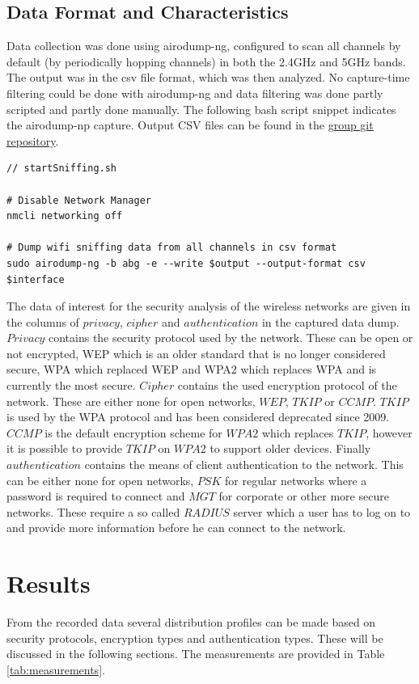 \documentclass[letterpaper, 10 pt, conference]{ieeeconf}  %
\begin{document}
\subsection{Data Format and Characteristics}
Data collection was done using airodump-ng, configured to scan all channels by default (by periodically hopping channels) in both the 2.4GHz and 5GHz bands. The output was in the csv file format, which was then analyzed. No capture-time filtering could be done with airodump-ng and data filtering was done partly scripted and partly done manually. The following bash script snippet indicates the airodump-np capture. Output CSV files can be found in the \href{https://github.com/HOkkerman/ET4394/tree/master/wireshark_airodump_captures/airodump}{group git repository}.
\begin{lstlisting}
// startSniffing.sh

# Disable Network Manager
nmcli networking off

# Dump wifi sniffing data from all channels in csv format
sudo airodump-ng -b abg -e --write $output --output-format csv $interface

\end{lstlisting}
 
The data of interest for the security analysis of the wireless networks are given in the columns of $privacy$, $cipher$ and $authentication$ in the captured data dump. $Privacy$ contains the security protocol used by the network. These can be open or not encrypted, WEP which is an older standard that is no longer considered secure, WPA which replaced WEP and WPA2 which replaces WPA and is currently the most secure. $Cipher$ contains the used encryption protocol of the network. These are either none for open networks, $WEP$, $TKIP$ or $CCMP$. $TKIP$ is used by the WPA protocol and has been considered deprecated since 2009. $CCMP$ is the default encryption scheme for $WPA2$ which replaces $TKIP$, however it is possible to provide $TKIP$ on $WPA2$ to support older devices. Finally $authentication$ contains the means of client authentication to the network. This can be either none for open networks, $PSK$ for regular networks where a password is required to connect and $MGT$ for corporate or other more secure networks. These require a so called $RADIUS$ server which a user has to log on to and provide more information before he can connect to the network.
 
\section{Results}
From the recorded data several distribution profiles can be made based on security protocols, encryption types and authentication types. These will be discussed in the following sections. The measurements are provided in Table \ref{tab:measurements}.
\end{document}

